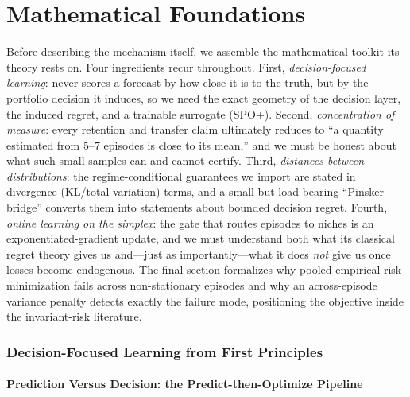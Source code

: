 \part{Mathematical Foundations}

Before describing the \nm{} mechanism itself, we assemble the mathematical
toolkit its theory rests on. Four ingredients recur throughout. First,
\emph{decision-focused learning}: \nm{} never scores a forecast by how close it
is to the truth, but by the portfolio decision it induces, so we need the exact
geometry of the decision layer, the induced regret, and a trainable surrogate
(SPO+). Second, \emph{concentration of measure}: every retention and transfer
claim ultimately reduces to ``a quantity estimated from $5$--$7$ episodes is
close to its mean,'' and we must be honest about what such small samples can
and cannot certify. Third, \emph{distances between distributions}: the
regime-conditional guarantees we import are stated in divergence
(KL/total-variation) terms, and a small but load-bearing ``Pinsker bridge''
converts them into statements about bounded decision regret. Fourth,
\emph{online learning on the simplex}: the gate that routes episodes to niches
is an exponentiated-gradient update, and we must understand both what its
classical regret theory gives us and---just as importantly---what it does
\emph{not} give us once losses become endogenous. The final section formalizes
why pooled empirical risk minimization fails across non-stationary episodes and
why an across-episode variance penalty detects exactly the failure mode,
positioning the \nm{} objective inside the invariant-risk literature.

\section{Decision-Focused Learning from First Principles}
\label{sec:dd1-dfl}

\subsection{Prediction Versus Decision: the Predict-then-Optimize Pipeline}
\label{sec:dd1-pto}

